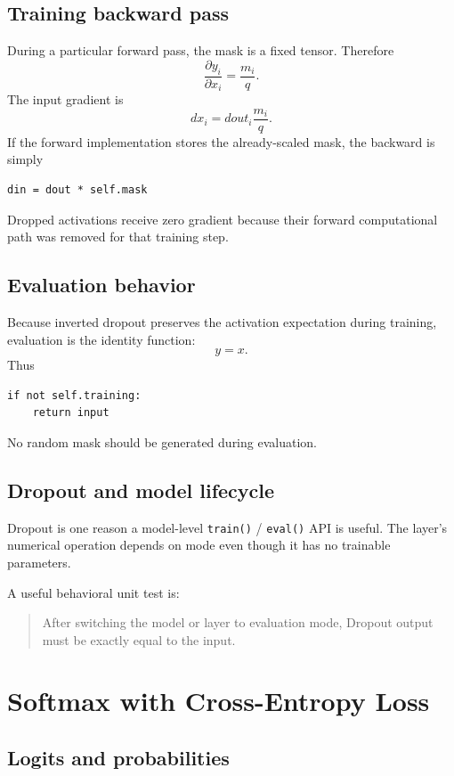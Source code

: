 \documentclass[11pt,a4paper]{article}
\newcommand{\pd}[2]{\frac{\partial #1}{\partial #2}}
\newcommand{\code}[1]{\texttt{#1}}
\begin{document}
\subsection{Training backward pass}

During a particular forward pass, the mask is a fixed tensor. Therefore
\[
\pd{y_i}{x_i}=\frac{m_i}{q}.
\]
The input gradient is
\[
\boxed{dx_i=dout_i\frac{m_i}{q}}.
\]
If the forward implementation stores the already-scaled mask, the backward is simply
\begin{lstlisting}
din = dout * self.mask
\end{lstlisting}

Dropped activations receive zero gradient because their forward computational path was removed for that training step.

\subsection{Evaluation behavior}

Because inverted dropout preserves the activation expectation during training, evaluation is the identity function:
\[
\boxed{y=x}.
\]
Thus
\begin{lstlisting}
if not self.training:
    return input
\end{lstlisting}
No random mask should be generated during evaluation.

\subsection{Dropout and model lifecycle}

Dropout is one reason a model-level \code{train()} / \code{eval()} API is useful. The layer's numerical operation depends on mode even though it has no trainable parameters.

A useful behavioral unit test is:
\begin{quote}
After switching the model or layer to evaluation mode, Dropout output must be exactly equal to the input.
\end{quote}

\section{Softmax with Cross-Entropy Loss}

\subsection{Logits and probabilities}
\end{document}
